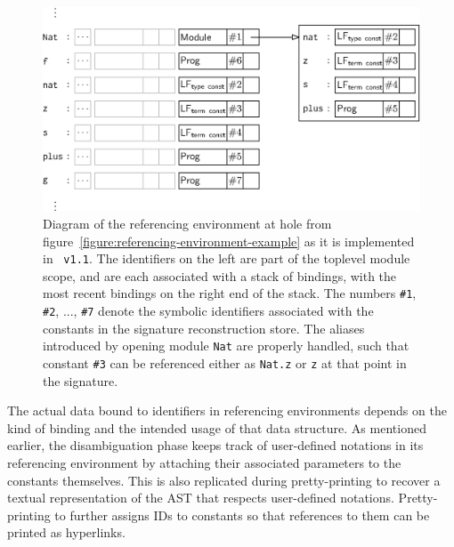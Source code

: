 \begin{figure}[htb]
\centering
\includegraphics{figures/referencing-environment-implementation.eps}
\caption[Example referencing environment in the implementation]{%
Diagram of the referencing environment at hole \texttt{} from figure~\ref{figure:referencing-environment-example} as it is implemented in \Beluga~\texttt{v1.1}.
The identifiers on the left are part of the toplevel module scope, and are each associated with a stack of bindings, with the most recent bindings on the right end of the stack.
The numbers \texttt{\#1}, \texttt{\#2}, ..., \texttt{\#7} denote the symbolic identifiers associated with the constants in the signature reconstruction store.
The aliases introduced by opening module \texttt{Nat} are properly handled, such that constant \texttt{\#3} can be referenced either as \texttt{Nat.z} or \texttt{z} at that point in the signature.
}
\label{figure:referencing-environment-implementation}
\end{figure}

The actual data bound to identifiers in referencing environments depends on the kind of binding and the intended usage of that data structure.
As mentioned earlier, the disambiguation phase keeps track of user-defined notations in its referencing environment by attaching their associated parameters to the constants themselves.
This is also replicated during pretty-printing to recover a textual representation of the \ac{AST} that respects user-defined notations.
Pretty-printing to \HTML further assigns IDs to constants so that references to them can be printed as hyperlinks.

